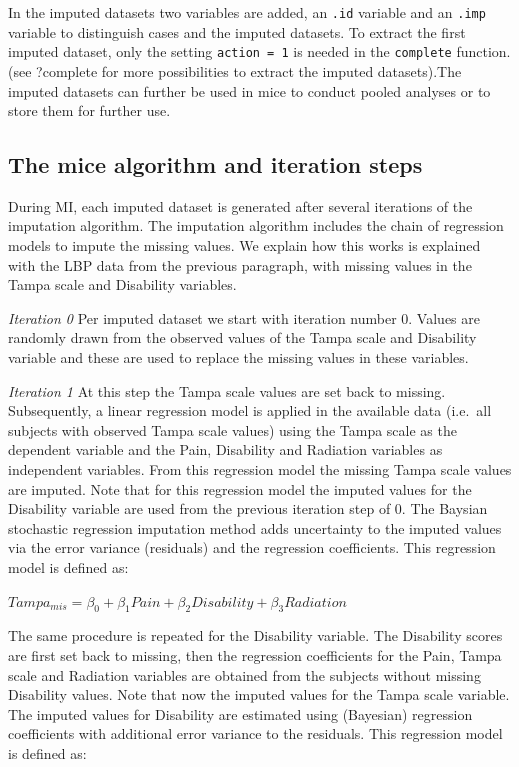 \documentclass[]{book}
\begin{document}
In the imputed datasets two variables are added, an \texttt{.id}
variable and an \texttt{.imp} variable to distinguish cases and the
imputed datasets. To extract the first imputed dataset, only the setting
\texttt{action\ =\ 1} is needed in the \texttt{complete} function. (see
?complete for more possibilities to extract the imputed datasets).The
imputed datasets can further be used in mice to conduct pooled analyses
or to store them for further use.

\subsection{The mice algorithm and iteration
steps}\label{the-mice-algorithm-and-iteration-steps}

During MI, each imputed dataset is generated after several iterations of
the imputation algorithm. The imputation algorithm includes the chain of
regression models to impute the missing values. We explain how this
works is explained with the LBP data from the previous paragraph, with
missing values in the Tampa scale and Disability variables.

\emph{Iteration 0} Per imputed dataset we start with iteration number 0.
Values are randomly drawn from the observed values of the Tampa scale
and Disability variable and these are used to replace the missing values
in these variables.

\emph{Iteration 1} At this step the Tampa scale values are set back to
missing. Subsequently, a linear regression model is applied in the
available data (i.e.~all subjects with observed Tampa scale values)
using the Tampa scale as the dependent variable and the Pain, Disability
and Radiation variables as independent variables. From this regression
model the missing Tampa scale values are imputed. Note that for this
regression model the imputed values for the Disability variable are used
from the previous iteration step of 0. The Baysian stochastic regression
imputation method adds uncertainty to the imputed values via the error
variance (residuals) and the regression coefficients. This regression
model is defined as:

\(Tampa_{mis} = \beta_0 + \beta_1Pain + \beta_2Disability + \beta_3Radiation\)

The same procedure is repeated for the Disability variable. The
Disability scores are first set back to missing, then the regression
coefficients for the Pain, Tampa scale and Radiation variables are
obtained from the subjects without missing Disability values. Note that
now the imputed values for the Tampa scale variable. The imputed values
for Disability are estimated using (Bayesian) regression coefficients
with additional error variance to the residuals. This regression model
is defined as:
\end{document}
